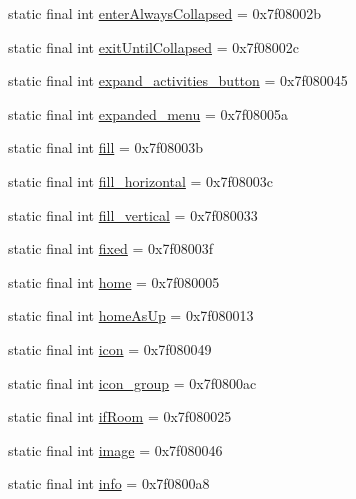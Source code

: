\begin{CompactItemize}
\item 
static final int \hyperlink{classandroid_1_1support_1_1v4_1_1_r_1_1id_c5fd55853b6834b5c0df201e64b88941}{enterAlwaysCollapsed} = 0x7f08002b
\item 
static final int \hyperlink{classandroid_1_1support_1_1v4_1_1_r_1_1id_325d0b78cada253747ffb3ea6c58cf33}{exitUntilCollapsed} = 0x7f08002c
\item 
static final int \hyperlink{classandroid_1_1support_1_1v4_1_1_r_1_1id_bfd6c2ad24d10146ad302cca95f26a2f}{expand\_\-activities\_\-button} = 0x7f080045
\item 
static final int \hyperlink{classandroid_1_1support_1_1v4_1_1_r_1_1id_4bfa440a1b3d5cd877b3341ebbc6c5ec}{expanded\_\-menu} = 0x7f08005a
\item 
static final int \hyperlink{classandroid_1_1support_1_1v4_1_1_r_1_1id_8a09f97fdc47df50892ad209711763eb}{fill} = 0x7f08003b
\item 
static final int \hyperlink{classandroid_1_1support_1_1v4_1_1_r_1_1id_a7bdbd5996d932f244f6e9754c0458da}{fill\_\-horizontal} = 0x7f08003c
\item 
static final int \hyperlink{classandroid_1_1support_1_1v4_1_1_r_1_1id_28fde6dfc49ddb47244f3722ff0d6146}{fill\_\-vertical} = 0x7f080033
\item 
static final int \hyperlink{classandroid_1_1support_1_1v4_1_1_r_1_1id_0d20bd3bb450ac867533493d3ecdb77d}{fixed} = 0x7f08003f
\item 
static final int \hyperlink{classandroid_1_1support_1_1v4_1_1_r_1_1id_f3c4382884f800d70c2772fa97981800}{home} = 0x7f080005
\item 
static final int \hyperlink{classandroid_1_1support_1_1v4_1_1_r_1_1id_43931814ce5bdd22e1559f9889efba57}{homeAsUp} = 0x7f080013
\item 
static final int \hyperlink{classandroid_1_1support_1_1v4_1_1_r_1_1id_f3896871e9a6d511f5b9f275def88af1}{icon} = 0x7f080049
\item 
static final int \hyperlink{classandroid_1_1support_1_1v4_1_1_r_1_1id_20b7a1899a0366f55c6f1f1aebedc341}{icon\_\-group} = 0x7f0800ac
\item 
static final int \hyperlink{classandroid_1_1support_1_1v4_1_1_r_1_1id_9f3b405ace534a295de94805d7bf942b}{ifRoom} = 0x7f080025
\item 
static final int \hyperlink{classandroid_1_1support_1_1v4_1_1_r_1_1id_e89befc7dffa109698e6e4aea51c4e7e}{image} = 0x7f080046
\item 
static final int \hyperlink{classandroid_1_1support_1_1v4_1_1_r_1_1id_8b931995ae0113032a59347dbab52a4e}{info} = 0x7f0800a8

\end{CompactItemize}

